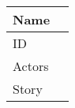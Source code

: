 \documentclass{article}
\newcommand\addrow[2]{#1 &#2\\ }
\newcommand\tabularhead{\begin{tabular}{lp{8cm}}
		\hline
	}
\newenvironment{usecase}{\tabularhead}
	{\hline\end{tabular}}
\begin{document}
	\begin{usecase}
		\addrow{Name}{  }
		\hline
		\addrow{ID}{}
		\hline
 		\addrow{Actors}{  }
		\hline		
		\addrow{Story}{ }
								

	\end{usecase}
	
\end{document}
